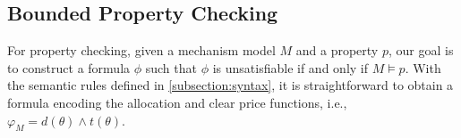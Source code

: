 \subsection{Bounded Property Checking}\label{subsection:property_checking}

For property checking, given a mechanism model $M$ and a property $p$, our goal is to construct a
formula $\phi$ such that $\phi$ is unsatisfiable if and only if $M \models p$.
With the semantic rules defined in \cref{subsection:syntax}, it is straightforward to obtain a
formula encoding the allocation and clear price functions, i.e., $\varphi_M = d(\theta) \wedge
t(\theta)$.

